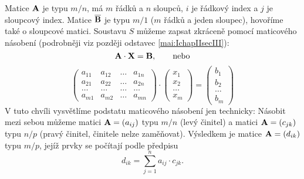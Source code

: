     Matice \(\mathbf{A}\) je typu \(m/n\), má \(m\) řádků a \(n\) sloupců, \(i\) je řádkový index a 
    \(j\) je sloupcový index. Matice \(\overline{\mathbf{B}}\) je typu \(m/1\) (\(m\) řádků a jeden 
    sloupec), hovoříme také o sloupcové matici. Soustavu \(S\) můžeme zapsat zkráceně pomocí 
    maticového násobení (podrobněji viz později odstavec \ref{mai:IchapIIsecIII}):
    \begin{equation*}
      \mathbf{A} \cdot \mathbf{X} = \mathbf{B}, \qquad \text{nebo}
    \end{equation*}  
    \begin{equation}\label{mai:eq004}
        \begin{pmatrix}
          a_{11} & a_{12} & \ldots & a_{1n} \\
          a_{21} & a_{22} & \ldots & a_{2n} \\
          \ldots & \ldots & \ldots & \ldots \\
          a_{m1} & a_{m2} & \ldots & a_{mn}
        \end{pmatrix}
        \cdot
        \begin{pmatrix}
          x_1     \\
          x_2     \\
          \ldots  \\
          x_m 
       \end{pmatrix}
        =
       \begin{pmatrix}
            b_1     \\
            b_2     \\
            \ldots  \\
            b_m 
          \end{pmatrix}
    \end{equation}
    V tuto chvíli vysvětlíme podstatu maticového násobení jen technicky: Násobit mezi sebou  můžeme matici 
    \(\mathbf{A} = (a_{ij})\) typu \(m/n\) (levý činitel) a matici \(\mathbf{A} = (c_{jk})\) typu 
    \(n/p\) (pravý činitel, činitele nelze zaměňovat). Výsledkem je matice \(\mathbf{A} = (d_{ik})\) 
    typu \(m/p\), jejíž prvky se počítají podle předpisu
    \begin{equation}\label{mai:eq005}
      d_{ik} = \sum_{j=1}^{n} a_{ij}\cdot c_{jk}.
    \end{equation}
    
